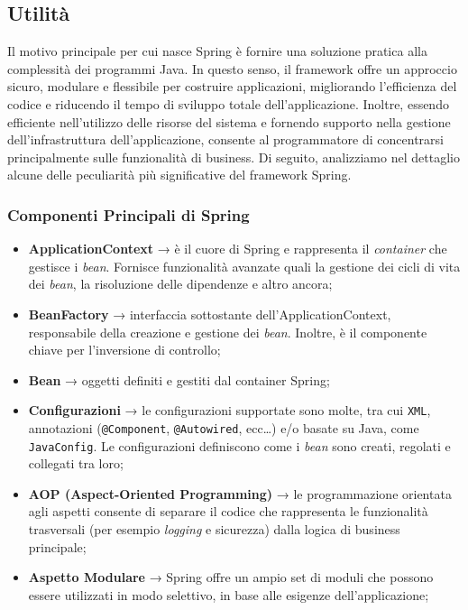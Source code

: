 \subsection{Utilità}

Il motivo principale per cui nasce Spring è fornire una soluzione pratica alla complessità dei programmi Java. In questo senso, il framework offre un approccio sicuro, modulare e flessibile per costruire applicazioni, migliorando l’efficienza del codice e riducendo il tempo di sviluppo totale dell’applicazione. Inoltre, essendo efficiente nell’utilizzo delle risorse del sistema e fornendo supporto nella gestione dell’infrastruttura dell’applicazione, consente al programmatore di concentrarsi principalmente sulle funzionalità di business.
Di seguito, analizziamo nel dettaglio alcune delle peculiarità più significative del framework Spring.\cite{SPRING_spring}

\subsubsection{Componenti Principali di Spring}
\begin{itemize}
    \item \textbf{ApplicationContext} → è il cuore di Spring e rappresenta il \textit{container} che gestisce i \textit{bean}. Fornisce funzionalità avanzate quali la gestione dei cicli di vita dei \textit{bean}, la risoluzione delle dipendenze e altro ancora;\cite{SPRING_baeldung}
    \item \textbf{BeanFactory} → interfaccia sottostante dell’ApplicationContext, responsabile della creazione e gestione dei \textit{bean}. Inoltre, è il componente chiave per l’inversione di controllo;\cite{SPRING_spring2}
    \item \textbf{Bean} → oggetti definiti e gestiti dal container Spring;\cite{SPRING_baeldung}
    \item \textbf{Configurazioni} → le configurazioni supportate sono molte, tra cui \texttt{XML}, annotazioni (\texttt{@Component}, \texttt{@Autowired}, ecc…) e/o basate su Java, come \texttt{JavaConfig}. Le configurazioni definiscono come i \textit{bean} sono creati, regolati e collegati tra loro;\cite{SPRING_baeldung}
    \item \textbf{AOP (Aspect-Oriented Programming)} → le programmazione orientata agli aspetti consente di separare il codice che rappresenta le funzionalità trasversali (per esempio \textit{logging} e sicurezza) dalla logica di business principale;\cite{SPRING_spring3}
    \item \textbf{Aspetto Modulare} → Spring offre un ampio set di moduli che possono essere utilizzati in modo selettivo, in base alle esigenze dell’applicazione;\cite{SPRING_spring2}
\end{itemize}

